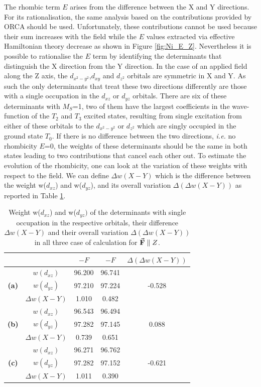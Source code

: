 \documentclass[12pt]{report}
\numberwithin{equation}{section}
\begin{document}
The rhombic term $E$ arises from the difference between the X and Y directions. For its rationalisation, the same analysis based on the contributions provided by ORCA should be used.
Unfortunately, these contributions cannot be used because their sum increases with the field while the $E$ values extracted via effective Hamiltonian theory decrease as shown in Figure \ref{fig:Ni_E_Z}.
Nevertheless it is possible to rationalise the $E$ term by identifying the determinants that distinguish the X direction from the Y direction. 
In the case of an applied field along the Z axis, the $d_{x^2-y^2}$,$d_{xy}$ and $d_{z^2}$ orbitals are symmetric in X and Y. As such the only determinants that treat these two directions differently are those with a single occupation in the $d_{xz}$ or $d_{yz}$ orbitals.
There are six of these determinants with $M_S$=1, two of them have the largest coefficients in the wave-function of the $T_2$ and $T_3$ excited states, resulting from single excitation from either of these orbitals to the $d_{x^2-y^2}$ or $d_{z^2}$ which are singly occupied in the ground state $T_0$.
If there is no difference between the two directions, \textit{i.e.} no rhombicity $E$=0, the weights of these determinants should be the same in both states leading to two contributions that cancel each other out. 
To estimate the evolution of the rhombicity, one can look at the variation of these weights with respect to the field.
We can define $\Delta w(X-Y)$ which is the difference between the weight w($d_{xz}$) and w($d_{yz}$), and its overall variation $\Delta (\Delta w(X-Y))$ as reported in Table \ref{tab:PoidsZ}.

\begin{table}[h]
    \centering
    \begin{tabular}{c | c | c c | c }
        & &  $-F$ & $-F$ & $\Delta (\Delta w(X-Y))$\\
        \hline
        \multirow{3}{*}{\textbf{(a)}}
        &$w(d_{xz})$ &  96.200 & 96.741 & \\
        &$w(d_{yz})$ &  97.210 & 97.224 & -0.528\\
        &$\Delta w(X-Y)$ & 1.010 & 0.482& \\
        \hline
        \multirow{3}{*}{\textbf{(b)}}
        &$w(d_{xz})$ &  96.543 & 96.494 & \\
        &$w(d_{yz})$ &  97.282 & 97.145 & 0.088\\
        &$\Delta w(X-Y)$ & 0.739 & 0.651& \\
        \hline
        \multirow{3}{*}{\textbf{(c)}}
        &$w(d_{xz})$ &  96.271 & 96.762 & \\
        &$w(d_{yz})$ &  97.282 & 97.152 & -0.621\\
        &$\Delta w(X-Y)$ & 1.011 & 0.390& \\
        \hline
    \end{tabular}
    \caption{Weight w($d_{xz}$) and w($d_{yz})$ of the determinants with single occupation in the respective orbitals, their difference $\Delta w(X-Y)$ and their overall variation $\Delta (\Delta w(X-Y))$ in all three case of calculation for $\vec{\vb{F}}\parallel Z$. }
    \label{tab:PoidsZ}
\end{table}
\end{document}
